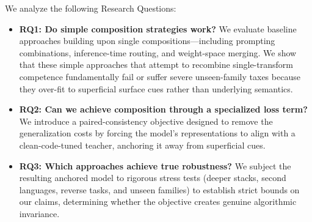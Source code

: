 We analyze the following Research Questions: 
\begin{itemize}
   \item \textbf{RQ1: Do simple composition strategies work?} We evaluate baseline approaches building upon single compositions---including prompting combinations, inference-time routing, and weight-space merging. We show that these simple approaches that attempt to recombine single-transform competence fundamentally fail or suffer severe unseen-family taxes because they over-fit to superficial surface cues rather than underlying semantics.
    \item \textbf{RQ2: Can we achieve composition through a specialized loss term?} We introduce a paired-consistency objective designed to remove the generalization costs by forcing the model's representations to align with a clean-code-tuned teacher, anchoring it away from superficial cues.
    \item \textbf{RQ3: Which approaches achieve true robustness?} We subject the resulting anchored model to rigorous stress tests (deeper stacks, second languages, reverse tasks, and unseen families) to establish strict bounds on our claims, determining whether the objective creates genuine algorithmic invariance.
\end{itemize}

